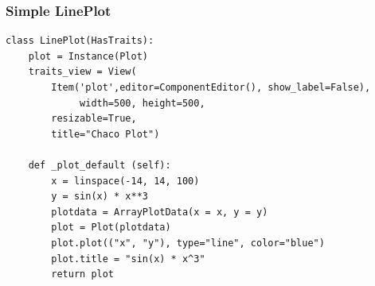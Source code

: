 \documentclass[14pt,compress]{beamer}
\begin{document}
\begin{frame}
\frametitle{Simple LinePlot}
\scriptsize
\begin{lstlisting}
class LinePlot(HasTraits):
    plot = Instance(Plot)
    traits_view = View(
        Item('plot',editor=ComponentEditor(), show_label=False),
             width=500, height=500,
        resizable=True,
        title="Chaco Plot")

    def _plot_default (self):
        x = linspace(-14, 14, 100)
        y = sin(x) * x**3
        plotdata = ArrayPlotData(x = x, y = y)
        plot = Plot(plotdata)
        plot.plot(("x", "y"), type="line", color="blue")
        plot.title = "sin(x) * x^3"
        return plot
\end{lstlisting}
\end{frame}

%
%
%
%
%
\end{document}
